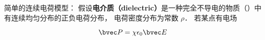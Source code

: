 
简单的连续电荷模型： 假设\textbf{电介质（dielectric）}是一种完全不导电的物质（）中有连续均匀分布的正负电荷分布， 电荷密度分布为常数 $\rho$． 若某点有电场



\begin{equation}
\bvec P = \chi \epsilon_0 \bvec E
\end{equation}
